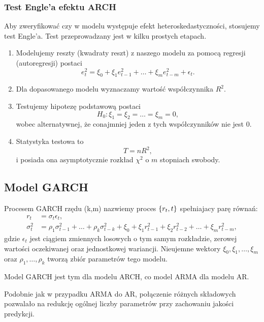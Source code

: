 \documentclass[10pt,a4paper]{book}
\begin{document}
\subsubsection{Test Engle'a efektu ARCH}

Aby zweryfikować czy w modelu występuje efekt heteroskedastyczności, stosujemy test Engle'a. Test przeprowadzany jest w kilku prostych etapach.

\begin{enumerate}
\item Modelujemy reszty (kwadraty reszt) z naszego modelu za pomocą regresji (autoregresji) postaci
$$
e_t^2 = \xi_0 + \xi_1 e_{t-1}^2 + \ldots + \xi_m e_{t-m}^2 + \epsilon_t.
$$
\item Dla dopasowanego modelu wyznaczamy wartość współczynnika $R^2$.
\item Testujemy hipotezę podstawową postaci
$$
H_0 : \xi_1 = \xi_2 = \ldots = \xi_m = 0,
$$
wobec alternatywnej, że conajmniej jeden z tych współczynników nie jest $0$.
\item Statystyka testowa to 
$$
T = n R^2,
$$
i posiada ona asymptotycznie rozkład  $\chi^2$ o $m$ stopniach swobody.
\end{enumerate}


\subsection{Model GARCH}

\begin{definition}
Procesem GARCH rzędu (k,m) nazwiemy proces $\left\lbrace {{r_t}, {t}} \right\rbrace$ spełniajacy parę równań:
\begin{align*}
r_t &= \sigma_t \epsilon_t,\\
\sigma^2_t &=\rho_1 \sigma_{t-1}^2 + \ldots + \rho_k \sigma_{t-k}^2+ \xi_0 + \xi_1 r_{t-1}^2 + \xi_2 r_{t-2}^2 + \ldots + \xi_m r_{t-m}^2,
\end{align*}
gdzie $\epsilon_t$ jest ciągiem zmiennych losowych o tym samym rozkładzie, zerowej wartości oczekiwanej oraz jednostkowej wariancji. Nieujemne wektory $\xi_0, \xi_1, \ldots, \xi_m$ oraz $\rho_1, \ldots, \rho_k$ tworzą zbiór parametrów tego modelu.
\end{definition}

\begin{remark}
Model GARCH jest tym dla modelu ARCH, co model ARMA dla modelu AR.
\end{remark}

\begin{remark}
Podobnie jak w przypadku ARMA do AR, połączenie różnych składowych pozwalało na redukcję ogólnej liczby parametrów przy zachowaniu jakości predykcji.
\end{remark}
\end{document}
